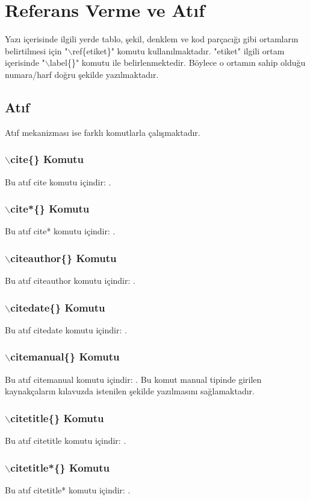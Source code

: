 \chapter{Referans Verme ve Atıf}
\label{ch:ref}
Yazı içerisinde ilgili yerde tablo, şekil, denklem ve kod parçacığı gibi ortamların belirtilmesi için "$\backslash$ref\{etiket\}" komutu kullanılmaktadır. "etiket" ilgili ortam içerisinde "$\backslash$label\{\}" komutu ile belirlenmektedir. Böylece o ortamın sahip olduğu numara/harf doğru şekilde yazılmaktadır. 

\section{Atıf}
Atıf mekanizması ise farklı komutlarla çalışmaktadır.

\subsection{$\backslash$cite\{\} Komutu}
Bu atıf cite komutu içindir: \cite{tekyazarArticle}.
\subsection{$\backslash$cite*\{\} Komutu}
Bu atıf cite* komutu içindir: \cite*{tekyazarArticle2}.
\subsection{$\backslash$citeauthor\{\} Komutu}
Bu atıf citeauthor komutu içindir: \citeauthor{tekyazarArticle}.
\subsection{$\backslash$citedate\{\} Komutu}
Bu atıf citedate komutu içindir: .
\subsection{$\backslash$citemanual\{\} Komutu}
Bu atıf citemanual komutu içindir: . Bu komut manual tipinde girilen kaynakçaların kılavuzda istenilen şekilde yazılmasını sağlamaktadır.
\subsection{$\backslash$citetitle\{\} Komutu}
Bu atıf citetitle komutu içindir: .
\subsection{$\backslash$citetitle*\{\} Komutu}
Bu atıf citetitle* komutu içindir: .
